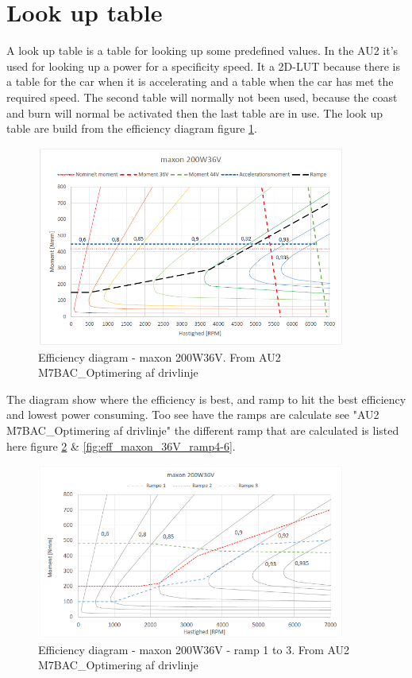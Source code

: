 \newpage
\section{Look up table}

A look up table is a table for looking up some predefined values. In the AU2 it's used for looking up a power for a specificity speed. It a 2D-LUT because there is a table for the car when it is accelerating and a table when the car has met the required speed. The second table will normally not been used, because the coast and burn will normal be activated then the last table are in use. The look up table are build from the efficiency diagram figure \ref{fig:eff_maxon_36V}. 

\begin{figure}[H]
	\centering
	\includegraphics [width=4in]{Software/Pictures/maxon-200W36V.PNG}
	\caption{Efficiency diagram - maxon 200W36V. From AU2 M7BAC\_Optimering af drivlinje}
	\label{fig:eff_maxon_36V}
\end{figure}

The diagram show where the efficiency is best, and ramp to hit the best efficiency and lowest power consuming. Too see have the ramps are calculate see "AU2 M7BAC\_Optimering af drivlinje" the different ramp that are calculated is listed here figure \ref{fig:eff_maxon_36V_ramp1-3} \& \ref{fig:eff_maxon_36V_ramp4-6}.

\begin{figure}[H]
	\centering
	\includegraphics [width=4in]{Software/Pictures/Momentramper-1-3.PNG}
	\caption{Efficiency diagram - maxon 200W36V - ramp 1 to 3. From AU2 M7BAC\_Optimering af drivlinje}
	\label{fig:eff_maxon_36V_ramp1-3}
\end{figure}

